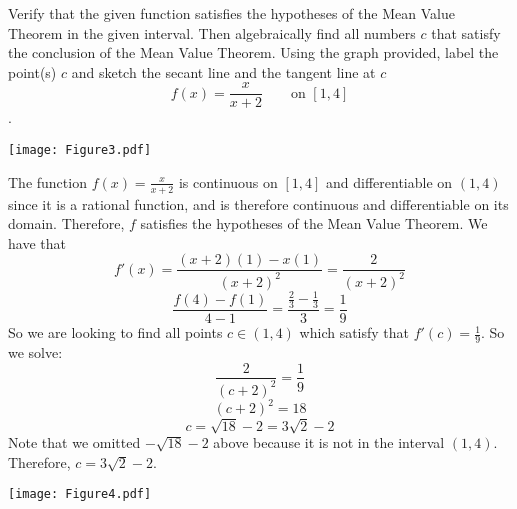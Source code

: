 \documentclass[nooutcomes]{ximera}
\begin{document}
\begin{problem}
Verify that the given function satisfies the hypotheses of the Mean Value Theorem in the given interval.  Then algebraically find all numbers $c$ that satisfy the conclusion of the Mean Value Theorem.  Using the graph provided, label the point(s) $c$ and sketch the secant line and the tangent line at $c$
$$ f(x) = \frac{x}{x+2} \qquad \text{on } [1,4] $$.
	\begin{image}
	\texttt{[image: Figure3.pdf]}
	\end{image}
		\begin{freeResponse}
		The function $f(x) = \frac{x}{x+2}$ is continuous on $[1,4]$ and differentiable on $(1,4)$ since it is a rational function, and is therefore continuous and differentiable on its domain.  Therefore, $f$ satisfies the hypotheses of the Mean Value Theorem.  We have that
		$$ f'(x) = \frac{(x+2)(1) - x(1)}{(x+2)^2} = \frac{2}{(x+2)^2} $$
		$$ \frac{f(4) - f(1)}{4-1} = \frac{\frac{2}{3} - \frac{1}{3}}{3} = \frac{1}{9} $$
		So we are looking to find all points $c \in (1,4)$ which satisfy that $ f'(c) = \frac{1}{9} $.  So we solve:
		$$ \frac{2}{(c+2)^2} = \frac{1}{9} $$
		$$ (c+2)^2 = 18 $$
		$$ c = \sqrt{18} - 2 = 3\sqrt{2} - 2 $$
		Note that we omitted $-\sqrt{18} - 2$ above because it is not in the interval $(1,4)$.  Therefore, $c = 3\sqrt{2} - 2$.
		
		\begin{image}
		\texttt{[image: Figure4.pdf]}
		\end{image}
		
		\end{freeResponse}
		
		
\end{problem}









	
	
	
	
	
	
	
	
			
			
\end{document}
